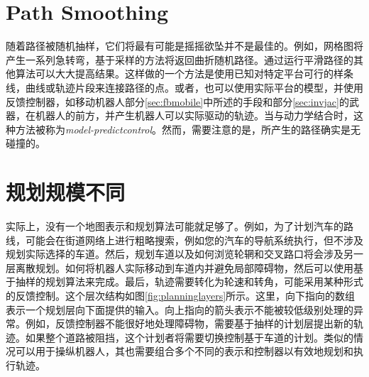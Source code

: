 \section{Path Smoothing}
随着路径被随机抽样，它们将最有可能是摇摇欲坠并不是最佳的。例如，网格图将产生一系列急转弯，基于采样的方法将返回曲折随机路径。通过运行平滑路径的其他算法可以大大提高结果。这样做的一个方法是使用已知对特定平台可行的样条线，曲线或轨迹片段来连接路径的点。或者，也可以使用实际平台的模型，并使用反馈控制器，如移动机器人部分\ref{sec:fbmobile}中所述的手段和部分\ref{sec:invjac}的武器，在机器人的前方，并产生机器人可以实际驱动的轨迹。当与动力学结合时，这种方法被称为\emph{model-predictcontrol}。然而，需要注意的是，所产生的路径确实是无碰撞的。




\section{规划规模不同}
实际上，没有一个地图表示和规划算法可能就足够了。例如，为了计划汽车的路线，可能会在街道网络上进行粗略搜索，例如您的汽车的导航系统执行，但不涉及规划实际选择的车道。然后，规划车道以及如何浏览轮辋和交叉路口将会涉及另一层离散规划。如何将机器人实际移动到车道内并避免局部障碍物，然后可以使用基于抽样的规划算法来完成。最后，轨迹需要转化为轮速和转角，可能采用某种形式的反馈控制。这个层次结构如图\ref{fig:planninglayers}所示。这里，向下指向的数组表示一个规划层向下面提供的输入。向上指向的箭头表示不能被较低级别处理的异常。例如，反馈控制器不能很好地处理障碍物，需要基于抽样的计划层提出新的轨迹。如果整个道路被阻挡，这个计划者将需要切换控制基于车道的计划。类似的情况可以用于操纵机器人，其也需要组合多个不同的表示和控制器以有效地规划和执行轨迹。


